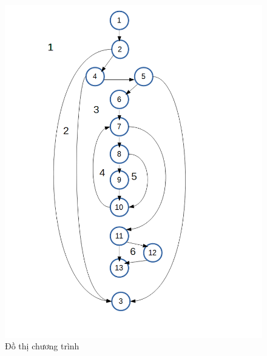 \documentclass[a4paper,12pt]{report}
\begin{document}
\begin{figure}[H]
\begin{minipage}[b]{0.45\linewidth}
\includegraphics[scale=0.4]{KTHopTrangDoThi.png}
		\caption{Đồ thị chương trình}
\end{minipage}					
\end{figure}
\end{document}
